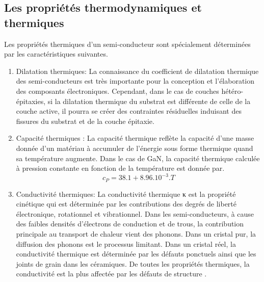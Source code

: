 \subsection{Les propriétés thermodynamiques et thermiques}
Les propriétés thermiques d'un semi-conducteur sont spécialement déterminées par les
caractéristiques suivantes.
\begin{enumerate}
	\item Dilatation thermiques: La connaissance du coefficient de dilatation thermique des semi-conducteurs est très importante pour la conception et l’élaboration des composants électroniques. Cependant, dans le cas de couches hétéro-épitaxies, si la dilatation thermique du substrat est différente de celle de la couche active, il pourra se créer des contraintes résiduelles induisant des fissures du substrat et de la couche épitaxie\cite{a12}.
	\item Capacité thermiques : La capacité thermique reflète la capacité d’une masse donnée d’un matériau à accumuler de l’énergie sous forme thermique quand sa température augmente. Dans le cas de GaN, la capacité thermique calculée à pression constante en fonction de la température est donnée par\cite{a13}. 
	\begin{equation}\label{key}
		c_{P}=38.1+8.96.10^{-3}.T
	\end{equation} 
	\item Conductivité thermiques: La conductivité thermique κ est la propriété cinétique qui est déterminée par les contributions des degrés de liberté électronique, rotationnel et vibrationnel. Dans les semi-conducteurs, à cause des faibles densités d’électrons de conduction et de trous, la contribution principale au transport de chaleur vient des phonons. Dans un cristal pur, la diffusion des phonons est le processus limitant. Dans un cristal réel, la conductivité thermique est déterminée par les défauts ponctuels ainsi que les joints de grain dans les céramiques. De toutes les propriétés thermiques, la conductivité est la plus affectée par les défauts de structure \cite{a14}. 
	
\end{enumerate}

